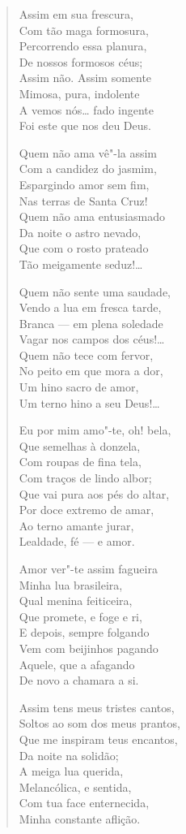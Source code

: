 \begin{verse}
Assim em sua frescura,\\
Com tão maga formosura,\\
Percorrendo essa planura,\\
De nossos formosos céus;\\
Assim não. Assim somente\\
Mimosa, pura, indolente\\
A vemos nós\ldots{} fado ingente\\
Foi este que nos deu Deus.

Quem não ama vê"-la assim\\
Com a candidez do jasmim,\\
Espargindo amor sem fim,\\
Nas terras de Santa Cruz!\\
Quem não ama entusiasmado\\
Da noite o astro nevado,\\
Que com o rosto prateado\\
Tão meigamente seduz!\ldots{}

Quem não sente uma saudade,\\
Vendo a lua em fresca tarde,\\
Branca --- em plena soledade\\
Vagar nos campos dos céus!\ldots{}\\
Quem não tece com fervor,\\
No peito em que mora a dor,\\
Um hino sacro de amor,\\
Um terno hino a seu Deus!\ldots{}

Eu por mim amo"-te, oh! bela,\\
Que semelhas à donzela,\\
Com roupas de fina tela,\\
Com traços de lindo albor;\\
Que vai pura aos pés do altar,\\
Por doce extremo de amar,\\
Ao terno amante jurar,\\
Lealdade, fé --- e amor.

Amor ver"-te assim fagueira\\
Minha lua brasileira,\\
Qual menina feiticeira,\\
Que promete, e foge e ri,\\
E depois, sempre folgando\\
Vem com beijinhos pagando\\
Aquele, que a afagando\\
De novo a chamara a si.

Assim tens meus tristes cantos,\\
Soltos ao som dos meus prantos,\\
Que me inspiram teus encantos,\\
Da noite na solidão;\\
A meiga lua querida,\\
Melancólica, e sentida,\\
Com tua face enternecida,\\
Minha constante aflição.
\end{verse}

